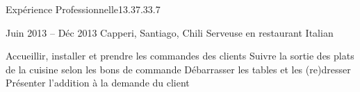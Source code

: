 \documentclass[30pt, french]{tccv}
\begin{document}
\begin{upshape}
\begin{flat_frame}{Expérience Professionnelle}{13.3}{7.3}{3.7}{}
\begin{eventlist}
\setlength{\parskip}{0pt}
\item{\color{text} Juin 2013 -- Déc 2013}
     {Capperi, Santiago, Chili}
     {Serveuse en restaurant Italian}
     \fontsize{9pt}{1em}\color{text}\bodyfontlight\upshape\selectfont

    \begin{itemize}
      \cvitem[\checkmark] Accueillir, installer et prendre les commandes des clients
      \cvitem[\checkmark] Suivre la sortie des plats de la cuisine selon les bons de commande
      \cvitem[\checkmark] Débarrasser les tables et les (re)dresser
      \cvitem[\checkmark] Présenter l’addition à la demande du client
      
    \end{itemize}       
  
  
\end{eventlist}
\end{flat_frame}






\end{upshape}
\end{document}
